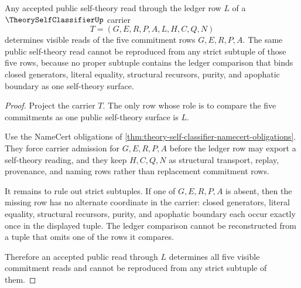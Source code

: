 \begin{theorem}
\label{thm:theory-self-classifier-ledger-row-inversion}
Any accepted public self-theory read through the ledger row $L$ of a $\TheorySelfClassifierUp$ carrier
$$
T=(G,E,R,P,A,L,H,C,Q,N)
$$
determines visible reads of the five commitment rows $G,E,R,P,A$. The same public self-theory read cannot be reproduced from any strict subtuple of those five rows, because no proper subtuple contains the ledger comparison that binds closed generators, literal equality, structural recursors, purity, and apophatic boundary as one self-theory surface.
\end{theorem}
\begin{proof}
Project the carrier $T$. The only row whose role is to compare the five commitments as one public self-theory surface is $L$.

Use the NameCert obligations of \autoref{thm:theory-self-classifier-namecert-obligations}. They force carrier admission for $G,E,R,P,A$ before the ledger row may export a self-theory reading, and they keep $H,C,Q,N$ as structural transport, replay, provenance, and naming rows rather than replacement commitment rows.

It remains to rule out strict subtuples. If one of $G,E,R,P,A$ is absent, then the missing row has no alternate coordinate in the carrier: closed generators, literal equality, structural recursors, purity, and apophatic boundary each occur exactly once in the displayed tuple. The ledger comparison cannot be reconstructed from a tuple that omits one of the rows it compares.

Therefore an accepted public read through $L$ determines all five visible commitment reads and cannot be reproduced from any strict subtuple of them.
\end{proof}


